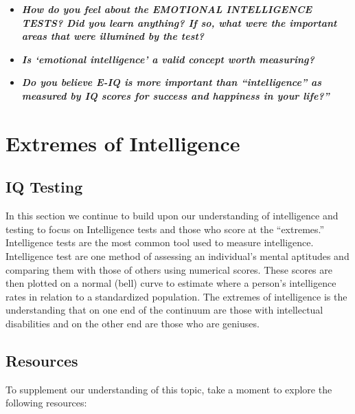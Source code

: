 \documentclass[
]{book}
\providecommand{\tightlist}{%
  \setlength{\itemsep}{0pt}\setlength{\parskip}{0pt}}
\begin{document}
\begin{reflect}
\begin{itemize}
\tightlist
\item
  \textbf{\emph{How do you feel about the EMOTIONAL INTELLIGENCE TESTS? Did you learn anything? If so, what were the important areas that were illumined by the test?}}\\
\item
  \textbf{\emph{Is `emotional intelligence' a valid concept worth measuring?}}\\
\item
  \textbf{\emph{Do you believe E-IQ is more important than ``intelligence'' as measured by IQ scores for success and happiness in your life?''}}
\end{itemize}
\end{reflect}

\hypertarget{extremes-of-intelligence}{%
\section{Extremes of Intelligence}\label{extremes-of-intelligence}}

\hypertarget{iq-testing}{%
\subsection*{IQ Testing}\label{iq-testing}}

In this section we continue to build upon our understanding of intelligence and testing to focus on Intelligence tests and those who score at the ``extremes.'' Intelligence tests are the most common tool used to measure intelligence. Intelligence test are one method of assessing an individual's mental aptitudes and comparing them with those of others using numerical scores. These scores are then plotted on a normal (bell) curve to estimate where a person's intelligence rates in relation to a standardized population. The extremes of intelligence is the understanding that on one end of the continuum are those with intellectual disabilities and on the other end are those who are geniuses.

\hypertarget{resources-2}{%
\subsection*{Resources}\label{resources-2}}

To supplement our understanding of this topic, take a moment to explore the following resources:
\end{document}
